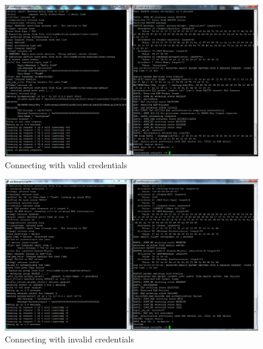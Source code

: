 \documentclass[12pt,a4paper,titlepage]{article}
\begin{document}
\begin{figure}[h!]
\centering
\includegraphics[scale=0.3]{./images/simulation/test2.png}
\caption{Connecting with valid credentials}
\end{figure}

\begin{figure}[h!]
\centering
\includegraphics[scale=0.3]{./images/simulation/test3.png}
\caption{Connecting with invalid credentials}
\end{figure}
\end{document}
